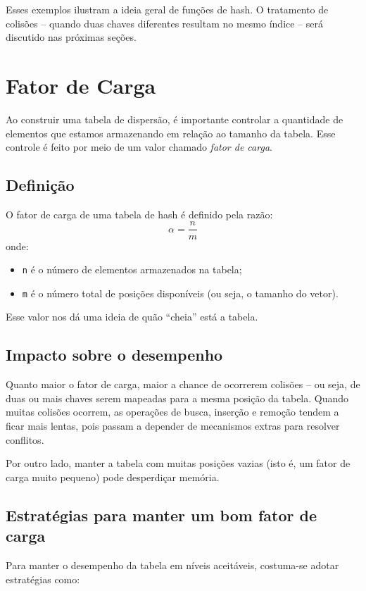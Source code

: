 Esses exemplos ilustram a ideia geral de funções de hash. 
O tratamento de colisões -- quando duas chaves diferentes resultam no mesmo índice -- será discutido nas próximas seções.

\section{Fator de Carga}

Ao construir uma tabela de dispersão, é importante controlar a quantidade de elementos que estamos armazenando em relação ao tamanho da tabela. 
Esse controle é feito por meio de um valor chamado \emph{fator de carga}.

\subsection*{Definição}

O fator de carga de uma tabela de hash é definido pela razão:
\[
\alpha = \frac{n}{m}
\]
onde:
\begin{itemize}
  \item \texttt{n} é o número de elementos armazenados na tabela;
  \item \texttt{m} é o número total de posições disponíveis (ou seja, o tamanho do vetor).
\end{itemize}

Esse valor nos dá uma ideia de quão ``cheia'' está a tabela.

\subsection*{Impacto sobre o desempenho}

Quanto maior o fator de carga, maior a chance de ocorrerem colisões -- ou seja, de duas ou mais chaves serem mapeadas para a mesma posição da tabela. 
Quando muitas colisões ocorrem, as operações de busca, inserção e remoção tendem a ficar mais lentas, pois passam a depender de mecanismos extras para resolver conflitos.

Por outro lado, manter a tabela com muitas posições vazias (isto é, um fator de carga muito pequeno) pode desperdiçar memória.

\subsection*{Estratégias para manter um bom fator de carga}

Para manter o desempenho da tabela em níveis aceitáveis, costuma-se adotar estratégias como:

